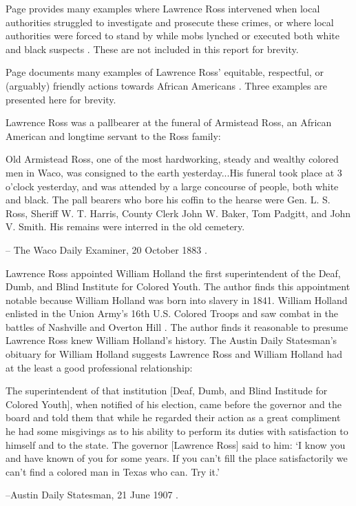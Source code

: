 \documentclass[12pt]{article}
\begin{document}
Page provides many examples where Lawrence Ross intervened when local authorities struggled to investigate and prosecute these crimes, or where local authorities were forced to stand by while mobs lynched or executed both white and black suspects \cite[pg. 95--155, etc]{page}. These are not included in this report for brevity.

Page documents many examples of Lawrence Ross' equitable, respectful, or (arguably) friendly actions towards African Americans \cite{page}. Three examples are presented here for brevity.

Lawrence Ross was a pallbearer at the funeral of Armistead Ross, an African American and longtime servant to the Ross family:
\begin{displayquote}
Old Armistead Ross, one of the most hardworking, steady and wealthy colored men in Waco, was consigned to the earth yesterday...His funeral took place at 3 o’clock yesterday, and was attended by a large concourse of people, both white and black. The pall bearers who bore his coffin to the hearse were Gen. L. S. Ross, Sheriff W. T. Harris, County Clerk John W. Baker, Tom Padgitt, and John V. Smith. His remains were interred in the old cemetery.

-- The Waco Daily Examiner, 20 October 1883 \cite{wde:1883-10-20}.
\end{displayquote}

Lawrence Ross appointed William Holland the first superintendent of the Deaf, Dumb, and Blind Institute for Colored Youth. The author finds this appointment notable because William Holland was born into slavery in 1841. William Holland enlisted in the Union Army's 16th U.S. Colored Troops and saw combat in the battles of Nashville and Overton Hill \cite{tsha:willholland}. The author finds it reasonable to presume Lawrence Ross knew William Holland's history. The Austin Daily Statesman's obituary for William Holland suggests Lawrence Ross and William Holland had at the least a good professional relationship:

\begin{displayquote}
The superintendent of that institution [Deaf, Dumb, and Blind Institude for Colored Youth], when notified of his election, came before the governor and the board and told them that while he regarded their action as a great compliment he had some misgivings as to his ability to perform its duties with satisfaction to himself and to the state. The governor [Lawrence Ross] said to him: ‘I know you and have known of you for some years. If you can’t fill the place satisfactorily we can’t find a colored man in Texas who can. Try it.’

--Austin Daily Statesman, 21 June 1907 \cite{astatesman:1907-06-21}.
\end{displayquote}
\end{document}
